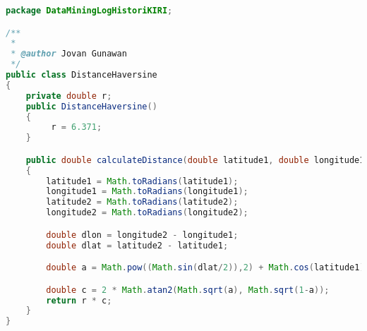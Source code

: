 \begin{lstlisting}[language=Java,basicstyle=\tiny,caption=DistanceHaversine.java]
package DataMiningLogHistoriKIRI;

/**
 *
 * @author Jovan Gunawan
 */
public class DistanceHaversine
{
    private double r;
    public DistanceHaversine()
    {
         r = 6.371;
    }

    public double calculateDistance(double latitude1, double longitude1, double latitude2, double longitude2)
    {
        latitude1 = Math.toRadians(latitude1);
        longitude1 = Math.toRadians(longitude1);
        latitude2 = Math.toRadians(latitude2);
        longitude2 = Math.toRadians(longitude2);

        double dlon = longitude2 - longitude1;
        double dlat = latitude2 - latitude1;

        double a = Math.pow((Math.sin(dlat/2)),2) + Math.cos(latitude1) * Math.cos(latitude2) * Math.pow(Math.sin(dlon/2),2);

        double c = 2 * Math.atan2(Math.sqrt(a), Math.sqrt(1-a));
        return r * c;
    }
}
\end{lstlisting}

